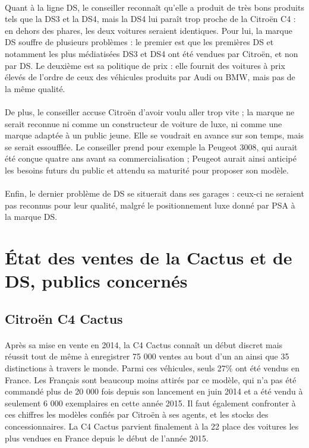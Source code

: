 \documentclass[12pt]{article}\usepackage[]{graphicx}\usepackage[]{color}
\begin{document}
\paragraph{} Quant à la ligne DS, le conseiller reconnaît qu'elle a produit de très bons
produits tels que la DS3 et la DS4, mais la DS4 lui paraît trop proche de la Citroën
C4 : en dehors des phares, les deux voitures seraient identiques.
Pour lui, la marque DS souffre de plusieurs problèmes : le premier est que les
premières DS et notamment les plus médiatisées DS3 et DS4 ont été vendues par
Citroën, et non par DS. Le deuxième est sa politique de prix : elle fournit des
voitures à prix élevés de l'ordre de ceux des véhicules produits par Audi ou BMW,
mais pas de la même qualité.

\paragraph{} De plus, le conseiller accuse Citroën d'avoir voulu aller trop vite ; la marque ne serait
reconnue ni comme un constructeur de voiture de luxe, ni comme une marque adaptée
à un public jeune. Elle se voudrait en avance sur son temps, mais se serait essoufflée.
Le conseiller prend pour exemple la Peugeot 3008, qui aurait été conçue quatre ans
avant sa commercialisation ; Peugeot aurait ainsi anticipé les besoins futurs du public
et attendu sa maturité pour proposer son modèle.

\paragraph{} Enfin, le dernier problème de DS se situerait dans ses garages :
ceux-ci ne seraient pas reconnus pour leur qualité, malgré le positionnement
luxe donné par PSA à la marque DS.

\section{État des ventes de la Cactus et de DS, publics concernés}

\subsection{Citroën C4 Cactus}

\paragraph{} Après sa mise en vente en 2014, la C4 Cactus connaît un début
discret mais réussit tout de même à enregistrer 75 000
ventes au bout d'un an ainsi que 35 distinctions à travers le
monde\cite{communique}. Parmi ces véhicules, seuls 27\% ont été vendus en France.
Les Français sont beaucoup moins attirés par ce modèle, qui n'a pas été
commandé plus de 20 000 fois depuis son lancement en juin 2014 et a été vendu
à seulement 6 000 exemplaires en cette année 2015. Il faut également confronter à
ces chiffres les modèles confiés par Citroën à ses agents, et les stocks des
concessionnaires. La C4 Cactus parvient finalement à la 22\ieme{} place des voitures
les plus vendues en France depuis le début de l'année 2015.
\end{document}
